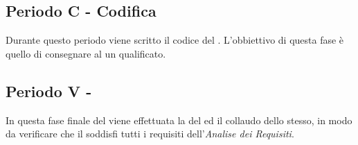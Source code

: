 \documentclass[./PianoDiProgetto.tex]{subfiles}
\begin{document}
  \subsection{Periodo C - Codifica}

  Durante questo periodo viene scritto il codice del . L'obbiettivo
  di questa fase è quello di consegnare al  un  qualificato.

  \subsection{Periodo V - }

  In questa fase finale del  viene effettuata la  del  ed il
  collaudo dello stesso, in modo da verificare che il  soddisfi tutti i requisiti
  dell'\textit{Analise dei Requisiti}. 
\end{document}
